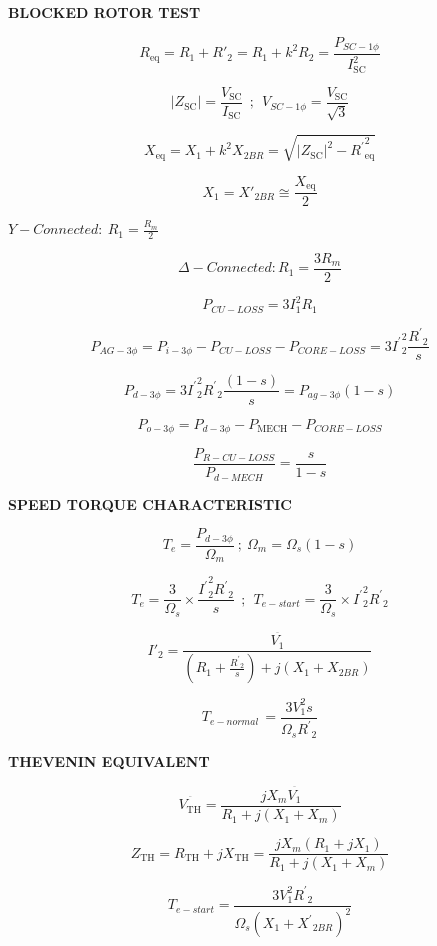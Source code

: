 \begin{multicols}{2}
	\textbf{BLOCKED ROTOR TEST}
	
	\[R_{\text{eq}} = R_{1} + {R'}_{2} = R_{1} + k^{2}R_{2} = \frac{P_{SC - 1\phi}}{I_{\text{SC}}^{2}}\]
	
	\[\left| Z_{\text{SC}} \right| = \frac{V_{\text{SC}}}{I_{\text{SC}}}\ \ ;\ \ V_{SC - 1\phi} = \frac{V_{\text{SC}}}{\sqrt{3}}\]
	
	\[X_{\text{eq}} = X_{1} + k^{2}X_{2BR} = \sqrt{\left| Z_{\text{SC}} \right|^{2} - {R^{'}}_{\text{eq}}^{2}}\]
	
	\[X_{1} = {X'}_{2BR} \cong \frac{X_{\text{eq}}}{2}\]
	
	\(Y - Connected:\ R_{1} = \frac{R_{m}}{2}\)
	
	\[\Delta - Connected:R_{1} = \frac{3R_{m}}{2}\]
	
	\[P_{CU - LOSS} = 3I_{1}^{2}R_{1}\]
	
	\[P_{AG - 3\phi} = P_{i - 3\phi} - P_{CU - LOSS} - P_{CORE - LOSS} = 3{I^{'}}_{2}^{2}\frac{{R^{'}}_{2}}{s}\]
	
	\[P_{d - 3\phi} = 3{I^{'}}_{2}^{2}{R^{'}}_{2}\frac{(1 - s)}{s} = P_{ag - 3\phi}(1 - s)\]
	
	\[P_{o - 3\phi} = P_{d - 3\phi} - P_{\text{MECH}} - P_{CORE - LOSS}\]
	
	\[\frac{P_{R - CU - LOSS}}{P_{d - MECH}} = \frac{s}{1 - s}\]
	
	\textbf{SPEED TORQUE CHARACTERISTIC}
	
	\[T_{e} = \frac{P_{d - 3\phi}}{\Omega_{m}}\ ;\ \Omega_{m} = \Omega_{s}(1 - s)\]
	
	\[T_{e} = \frac{3}{\Omega_{s}} \times \frac{{I^{'}}_{2}^{2}{R^{'}}_{2}}{s}\ \ ;\ \ T_{e - start} = \frac{3}{\Omega_{s}} \times {I^{'}}_{2}^{2}{R^{'}}_{2}\]
	
	\[{I'}_{2} = \frac{\overset{\overline{}}{V_{1}}}{\left( R_{1} + \frac{{R^{'}}_{2}}{s} \right) + j\left( X_{1} + X_{2BR} \right)}\]
	
	\[T_{e - normal\ } = \frac{3V_{1}^{2}s}{\Omega_{s}{R^{'}}_{2}}\]
	
	\textbf{THEVENIN EQUIVALENT}
	
	\[\overset{\overline{}}{V_{\text{TH}}} = \frac{jX_{m}\overset{\overline{}}{V_{1}}}{R_{1} + j\left( X_{1} + X_{m} \right)}\]
	
	\[Z_{\text{TH}} = R_{\text{TH}} + jX_{\text{TH}} = \frac{jX_{m}\left( R_{1} + jX_{1} \right)}{R_{1} + j\left( X_{1} + X_{m} \right)}\]
	
	\[T_{e - start} = \frac{3V_{1}^{2}{R^{'}}_{2}}{{\Omega_{s}\left( X_{1} + {X^{'}}_{2BR} \right)}^{2}}\]
	

\end{multicols}
